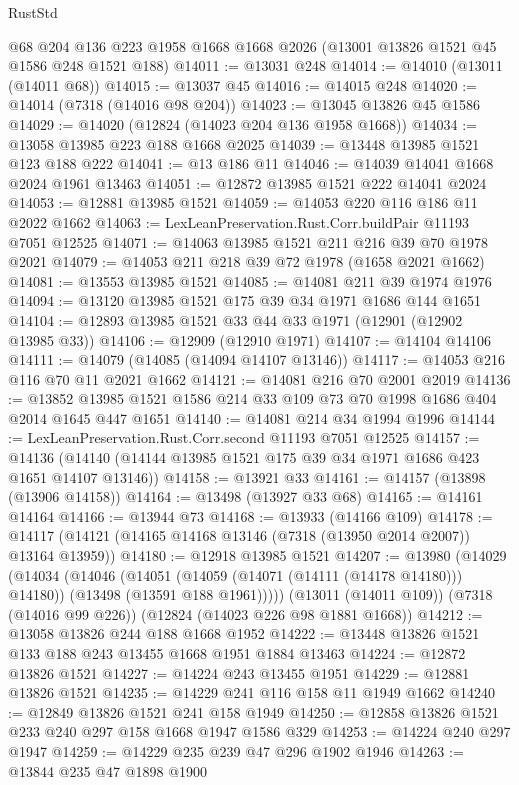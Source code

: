 \begin{lexlean}{RustStd}
\begin{coremodule}
    @68
    @204
    @136
    @223
    @1958
    @1668
    @1668
    @2026
    (@13001 @13826 @1521 @45 @1586 @248 @1521 @188)
@14011 := @13031 @248
@14014 := @14010 (@13011 (@14011 @68))
@14015 := @13037 @45
@14016 := @14015 @248
@14020 := @14014 (@7318 (@14016 @98 @204))
@14023 := @13045 @13826 @45 @1586
@14029 := @14020 (@12824 (@14023 @204 @136 @1958 @1668))
@14034 := @13058 @13985 @223 @188 @1668 @2025
@14039 := @13448 @13985 @1521 @123 @188 @222
@14041 := @13 @186 @11
@14046 := @14039 @14041 @1668 @2024 @1961 @13463
@14051 := @12872 @13985 @1521 @222 @14041 @2024
@14053 := @12881 @13985 @1521
@14059 := @14053 @220 @116 @186 @11 @2022 @1662
@14063 := LexLeanPreservation.Rust.Corr.buildPair @11193 @7051 @12525
@14071 := @14063 @13985 @1521 @211 @216 @39 @70 @1978 @2021
@14079 := @14053 @211 @218 @39 @72 @1978 (@1658 @2021 @1662)
@14081 := @13553 @13985 @1521
@14085 := @14081 @211 @39 @1974 @1976
@14094 := @13120 @13985 @1521 @175 @39 @34 @1971 @1686 @144 @1651
@14104 := @12893 @13985 @1521 @33 @44 @33 @1971 (@12901 (@12902 @13985 @33))
@14106 := @12909 (@12910 @1971)
@14107 := @14104 @14106
@14111 := @14079 (@14085 (@14094 @14107 @13146))
@14117 := @14053 @216 @116 @70 @11 @2021 @1662
@14121 := @14081 @216 @70 @2001 @2019
@14136 := @13852 @13985 @1521 @1586 @214 @33 @109 @73 @70 @1998 @1686 @404 @2014 @1645 @447 @1651
@14140 := @14081 @214 @34 @1994 @1996
@14144 := LexLeanPreservation.Rust.Corr.second @11193 @7051 @12525
@14157 := @14136 (@14140 (@14144 @13985 @1521 @175 @39 @34 @1971 @1686 @423 @1651 @14107 @13146))
@14158 := @13921 @33
@14161 := @14157 (@13898 (@13906 @14158))
@14164 := @13498 (@13927 @33 @68)
@14165 := @14161 @14164
@14166 := @13944 @73
@14168 := @13933 (@14166 @109)
@14178 := @14117 (@14121 (@14165 @14168 @13146 (@7318 (@13950 @2014 @2007)) @13164 @13959))
@14180 := @12918 @13985 @1521
@14207 := @13980
    (@14029
      (@14034
        (@14046
          (@14051 (@14059 (@14071 (@14111 (@14178 @14180))) @14180))
          (@13498 (@13591 @188 @1961)))))
    (@13011 (@14011 @109))
    (@7318 (@14016 @99 @226))
    (@12824 (@14023 @226 @98 @1881 @1668))
@14212 := @13058 @13826 @244 @188 @1668 @1952
@14222 := @13448 @13826 @1521 @133 @188 @243 @13455 @1668 @1951 @1884 @13463
@14224 := @12872 @13826 @1521
@14227 := @14224 @243 @13455 @1951
@14229 := @12881 @13826 @1521
@14235 := @14229 @241 @116 @158 @11 @1949 @1662
@14240 := @12849 @13826 @1521 @241 @158 @1949
@14250 := @12858 @13826 @1521 @233 @240 @297 @158 @1668 @1947 @1586 @329
@14253 := @14224 @240 @297 @1947
@14259 := @14229 @235 @239 @47 @296 @1902 @1946
@14263 := @13844 @235 @47 @1898 @1900

\end{coremodule}
\end{lexlean}
